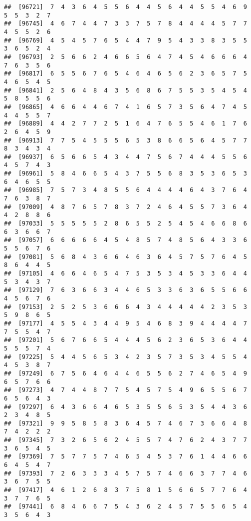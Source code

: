 \documentclass[
]{book}
\begin{document}
\begin{verbatim}
##  [96721]  7  4  3  6  4  5  5  6  4  4  5  6  4  4  5  5  4  6  9  5  5  3  2  7
##  [96745]  4  6  7  4  4  7  3  3  7  5  7  8  4  4  4  4  5  7  7  4  5  5  2  6
##  [96769]  4  5  4  5  7  6  5  4  4  7  9  5  4  3  3  8  3  5  5  3  6  5  2  4
##  [96793]  2  5  6  6  2  4  6  6  5  6  4  7  4  5  4  6  6  6  4  7  6  3  5  6
##  [96817]  6  5  5  6  7  6  5  4  6  4  6  5  6  2  3  6  5  7  5  4  6  5  4  5
##  [96841]  2  5  6  4  8  4  3  5  6  8  6  7  5  5  3  5  4  5  4  5  8  5  5  6
##  [96865]  4  6  6  4  4  6  7  4  1  6  5  7  3  5  6  4  7  4  5  4  4  5  5  7
##  [96889]  4  4  2  7  7  2  5  1  6  4  7  6  5  5  4  6  1  7  6  2  6  4  5  9
##  [96913]  7  7  5  4  5  5  5  6  5  3  8  6  6  5  6  4  5  7  7  8  3  4  3  4
##  [96937]  6  5  6  6  5  4  3  4  4  7  5  6  7  4  4  4  5  5  6  4  5  7  4  3
##  [96961]  5  8  4  6  6  5  4  3  7  5  5  6  8  3  5  3  6  5  3  6  4  6  5  5
##  [96985]  7  5  7  3  4  8  5  5  6  4  4  4  4  6  4  3  7  6  4  7  6  3  8  7
##  [97009]  4  8  7  6  5  7  8  3  7  2  4  6  4  5  5  7  3  6  4  4  2  8  8  6
##  [97033]  5  5  5  5  5  2  8  6  5  5  2  5  4  5  4  6  6  8  6  6  3  6  6  7
##  [97057]  6  6  6  6  6  4  5  4  8  5  7  4  8  5  6  4  3  3  6  5  5  6  7  6
##  [97081]  5  6  8  4  3  6  6  4  6  3  6  4  5  7  5  7  6  4  5  8  6  4  4  5
##  [97105]  4  6  6  4  6  5  4  7  5  3  5  3  4  5  3  3  6  4  4  5  3  4  3  7
##  [97129]  7  6  3  6  6  3  4  4  6  5  3  3  6  3  6  5  5  6  6  4  5  6  7  6
##  [97153]  2  5  2  5  3  6  6  6  4  3  4  4  4  4  4  2  3  5  3  5  9  8  6  5
##  [97177]  4  5  5  4  3  4  4  9  5  4  6  8  3  9  4  4  4  4  7  7  5  5  4  7
##  [97201]  5  6  7  6  6  5  4  4  4  5  6  2  3  6  5  3  6  4  4  5  5  5  7  4
##  [97225]  5  4  4  5  6  5  3  4  2  3  5  7  3  5  3  4  5  5  4  4  5  3  8  7
##  [97249]  6  7  5  6  4  6  4  4  6  5  5  6  2  7  4  6  5  4  9  6  5  7  6  6
##  [97273]  4  7  4  4  8  7  7  5  4  5  7  5  4  9  6  5  5  6  7  6  5  6  4  3
##  [97297]  6  4  3  6  6  4  6  5  3  5  5  6  5  3  5  4  4  3  6  2  3  4  8  5
##  [97321]  9  9  5  8  5  8  3  6  4  5  7  4  6  7  3  6  6  4  8  7  4  2  2  2
##  [97345]  7  3  2  6  5  6  2  4  5  5  7  4  7  6  2  4  3  7  7  3  6  5  4  5
##  [97369]  7  5  7  7  5  7  4  6  5  4  5  3  7  6  1  4  4  6  6  6  4  5  4  7
##  [97393]  7  2  6  3  3  3  4  5  7  5  7  4  6  6  3  7  7  4  6  3  6  7  5  5
##  [97417]  4  6  1  2  6  8  3  7  5  8  1  5  6  6  5  7  7  6  4  3  7  7  6  5
##  [97441]  6  8  4  6  6  7  5  4  3  6  2  4  5  7  5  5  6  5  4  3  5  6  4  3

\end{verbatim}
\end{document}
